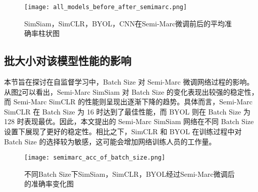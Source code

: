 \documentclass[master]{thesis-uestc}
\begin{document}
\begin{figure}[h]
    \centering
    \texttt{[image: all\_models\_before\_after\_semimarc.png]}
    \caption{SimSiam，SimCLR，BYOL，CNN在Semi-Marc微调前后的平均准确率柱状图}
    \label{all_models_before_after_semimarc}
\end{figure}

\subsection{批大小对该模型性能的影响}
本节旨在探讨在自监督学习中，Batch Size 对 Semi-Marc 微调网络过程的影响。从图\ref{semimarc_acc_of_batch_size}可以看出，Semi-Marc SimSiam 对 Batch Size 的变化表现出较强的稳定性，而 Semi-Marc SimCLR 的性能则呈现出逐渐下降的趋势。具体而言，Semi-Marc SimCLR 在 Batch Size 为 16 时达到了最佳性能，而 BYOL 则在 Batch Size 为 128 时表现最优。因此，本文提出的 Semi-Marc SimSiam 网络在不同 Batch Size 设置下展现了更好的稳定性。相比之下，SimCLR 和 BYOL 在训练过程中对 Batch Size 的选择较为敏感，这可能会增加网络训练人员的工作量。

\begin{figure}[h]
    \centering
    \texttt{[image: semimarc\_acc\_of\_batch\_size.png]}
    \caption{不同Batch Size下SimSiam，SimCLR，BYOL经过Semi-Marc微调后的准确率变化图}
    \label{semimarc_acc_of_batch_size}
\end{figure}

\end{document}
